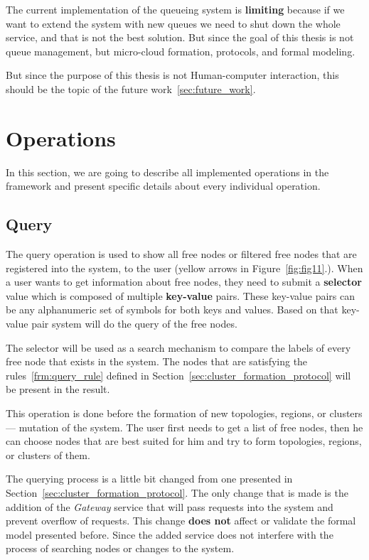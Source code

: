 The current implementation of the queueing system is \textbf{limiting} because if we want to extend the system with new queues we need to shut down the whole service, and that is not the best solution. But since the goal of this thesis is not queue management, but micro-cloud formation, protocols, and formal modeling.

But since the purpose of this thesis is not Human-computer interaction, this should be the topic of the future work~\ref{sec:future_work}.
%
%
\section{Operations}\label{sec:framework_operations}
%
In this section, we are going to describe all implemented operations in the framework and present specific details about every individual operation.
%
%
\subsection{Query}\label{sec:query} 
% 
The query operation is used to show all free nodes or filtered free nodes that are registered into the system, to the user (yellow arrows in Figure~\ref{fig:fig11}.). When a user wants to get information about free nodes, they need to submit a \textbf{selector} value which is composed of multiple \textbf{key-value} pairs.  These key-value pairs can be any alphanumeric set of symbols for both keys and values. Based on that key-value pair system will do the query of the free nodes.

The selector will be used as a search mechanism to compare the labels of every free node that exists in the system. The nodes that are satisfying the rules~\ref{frm:query_rule} defined in Section~\ref{sec:cluster_formation_protocol} will be present in the result.

This operation is done before the formation of new topologies, regions, or clusters --- mutation of the system. The user first needs to get a list of free nodes, then he can choose nodes that are best suited for him and try to form topologies, regions, or clusters of them.

The querying process is a little bit changed from one presented in Section~\ref{sec:cluster_formation_protocol}. The only change that is made is the addition of the \emph{Gateway} service that will pass requests into the system and prevent overflow of requests. This change \textbf{does not} affect or validate the formal model presented before. Since the added service does not interfere with the process of searching nodes or changes to the system.

